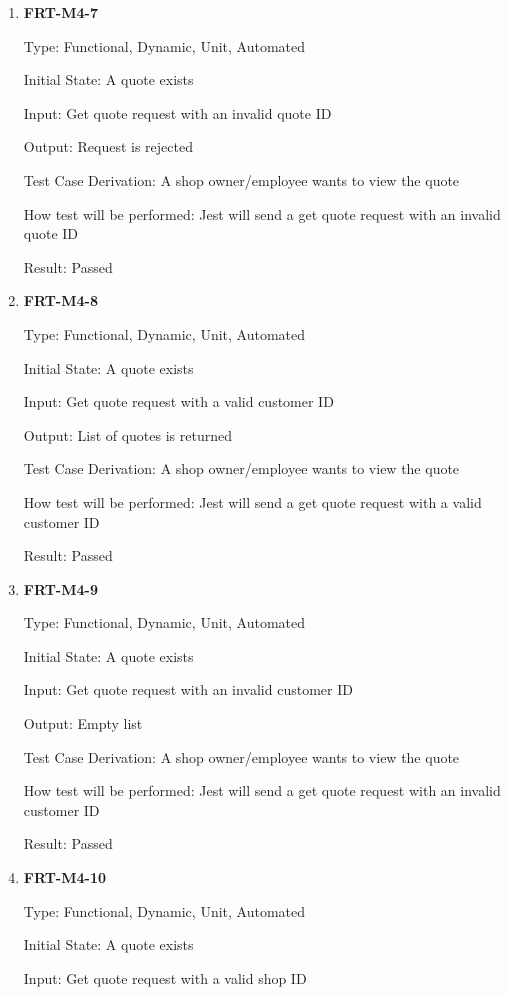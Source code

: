\documentclass[12pt, titlepage]{article}
\begin{document}
\begin{enumerate}
	\item \textbf{FRT-M4-7}

	      Type: Functional, Dynamic, Unit, Automated

	      Initial State: A quote exists

	      Input: Get quote request with an invalid quote ID

	      Output: Request is rejected

	      Test Case Derivation: A shop owner/employee wants to view the quote

	      How test will be performed: Jest will send a get quote request with an invalid quote ID

	      Result: Passed

	\item \textbf{FRT-M4-8}

	      Type: Functional, Dynamic, Unit, Automated

	      Initial State: A quote exists

	      Input: Get quote request with a valid customer ID

	      Output: List of quotes is returned

	      Test Case Derivation: A shop owner/employee wants to view the quote

	      How test will be performed: Jest will send a get quote request with a valid customer ID

	      Result: Passed

	\item \textbf{FRT-M4-9}

	      Type: Functional, Dynamic, Unit, Automated

	      Initial State: A quote exists

	      Input: Get quote request with an invalid customer ID

	      Output: Empty list

	      Test Case Derivation: A shop owner/employee wants to view the quote

	      How test will be performed: Jest will send a get quote request with an invalid customer ID

	      Result: Passed

	\item \textbf{FRT-M4-10}

	      Type: Functional, Dynamic, Unit, Automated

	      Initial State: A quote exists

	      Input: Get quote request with a valid shop ID


\end{enumerate}
\end{document}
